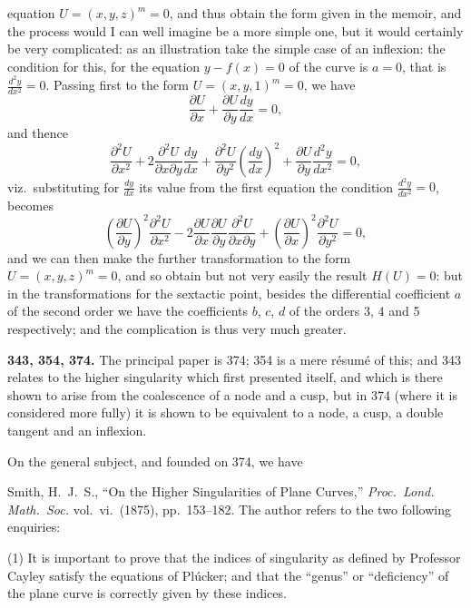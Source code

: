 \documentclass[12pt,a4paper]{article}
\theoremstyle{plain}
\begin{document}
equation $U=(x,y,z)^m=0$, and thus obtain the form given in the memoir, and the process would I can well imagine be a more simple one, but it would certainly be very complicated: as an illustration take the simple case of an inflexion: the condition for this, for the equation $y-f(x)=0$ of the curve is $a=0$, that is $\frac{d^2y}{dx^2}=0$. Passing first to the form $U=(x,y,1)^m=0$, we have
\[\frac{\partial U}{\partial x} + \frac{\partial U}{\partial y}\frac{dy}{dx} = 0,\]
and thence
\[\frac{\partial^2 U}{\partial x^2} + 2\frac{\partial^2 U}{\partial x\partial y}\frac{dy}{dx} + \frac{\partial^2 U}{\partial y^2}\left(\frac{dy}{dx}\right)^2 + \frac{\partial U}{\partial y}\frac{d^2y}{dx^2} = 0,\]
viz.~substituting for $\frac{dy}{dx}$ its value from the first equation the condition $\frac{d^2y}{dx^2}=0$, becomes
\[\left(\frac{\partial U}{\partial y}\right)^2\frac{\partial^2 U}{\partial x^2} - 2\frac{\partial U}{\partial x}\frac{\partial U}{\partial y}\frac{\partial^2 U}{\partial x\partial y} + \left(\frac{\partial U}{\partial x}\right)^2\frac{\partial^2 U}{\partial y^2} = 0,\]
and we can then make the further transformation to the form $U=(x,y,z)^m=0$, and so obtain but not very easily the result $H(U)=0$: but in the transformations for the sextactic point, besides the differential coefficient $a$ of the second order we have the coefficients $b$, $c$, $d$ of the orders 3, 4 and 5 respectively; and the complication is thus very much greater.

\vspace{0.3cm}
\noindent\textbf{343, 354, 374.} The principal paper is 374; 354 is a mere r\'{e}sum\'{e} of this; and 343 relates to the higher singularity which first presented itself, and which is there shown to arise from the coalescence of a node and a cusp, but in 374 (where it is considered more fully) it is shown to be equivalent to a node, a cusp, a double tangent and an inflexion.

On the general subject, and founded on 374, we have

\vspace{0.2cm}
Smith, H.~J.~S., ``On the Higher Singularities of Plane Curves,'' \textit{Proc.~Lond. Math.~Soc.} vol.~vi.~(1875), pp.~153--182. The author refers to the two following enquiries:

(1) It is important to prove that the indices of singularity as defined by Professor Cayley satisfy the equations of Pl\'{u}cker; and that the ``genus'' or ``deficiency'' of the plane curve is correctly given by these indices.
\end{document}
